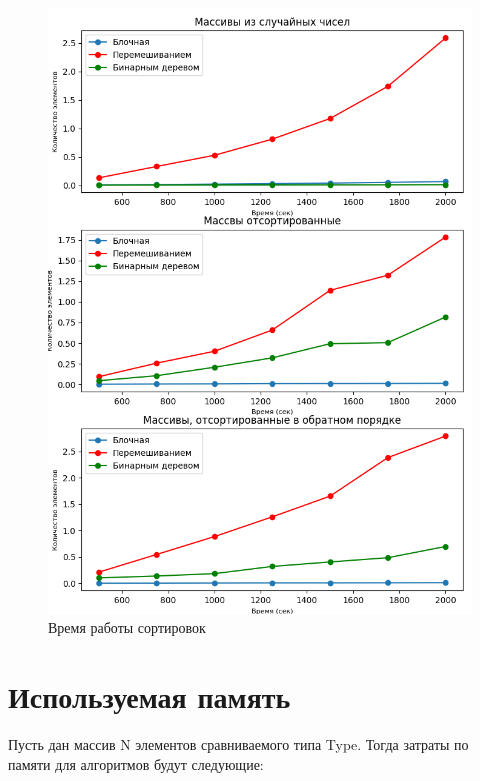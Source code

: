 \begin{figure}[h!]
	\centering
	\includegraphics[width=1\linewidth]{img/Plot.png}
	\caption{Время работы сортировок}
	\label{fig:mpr}
\end{figure}


\section{Используемая память}

Пусть дан массив N элементов сравниваемого типа Type. Тогда затраты по памяти для алгоритмов будут следующие:

